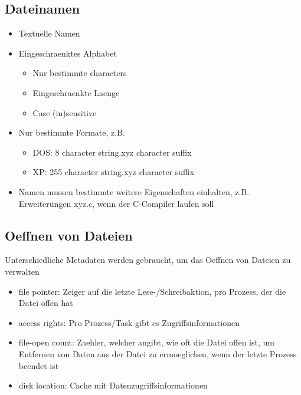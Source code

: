 \documentclass[a4paper]{scrreprt}
\begin{document}
\subsection{Dateinamen}
\begin{itemize}
	\item Textuelle Namen
	\item Eingeschraenktes Alphabet
		\begin{itemize}
			\item Nur bestimmte characters
			\item Eingeschraenkte Laenge
			\item Case (in)sensitive
		\end{itemize}
	\item Nur bestimmte Formate, z.B.
		\begin{itemize}
			\item DOS: 8 character string.xyz character suffix
			\item XP: 255 character string.xyz character suffix
		\end{itemize}
	\item Namen mussen bestimmte weitere Eigenschaften einhalten, z.B. Erweiterungen xyz.c, wenn der C-Compiler laufen soll
\end{itemize}

\subsection{Oeffnen von Dateien}
Unterschiedliche Metadaten werden gebraucht, um das Oeffnen von Dateien zu verwalten
\begin{itemize}
	\item file pointer: Zeiger auf die letzte Lese-/Schreibaktion, pro Prozess, der die Datei offen hat
	\item access rights: Pro Prozess/Task gibt es Zugriffsinformationen
	\item file-open count: Zaehler, welcher angibt, wie oft die Datei offen ist, um Entfernen von Daten aus der Datei zu ermoeglichen, wenn der letzte Prozess beendet ist
	\item disk location: Cache mit Datenzugriffsinformationen
\end{itemize}
\end{document}
